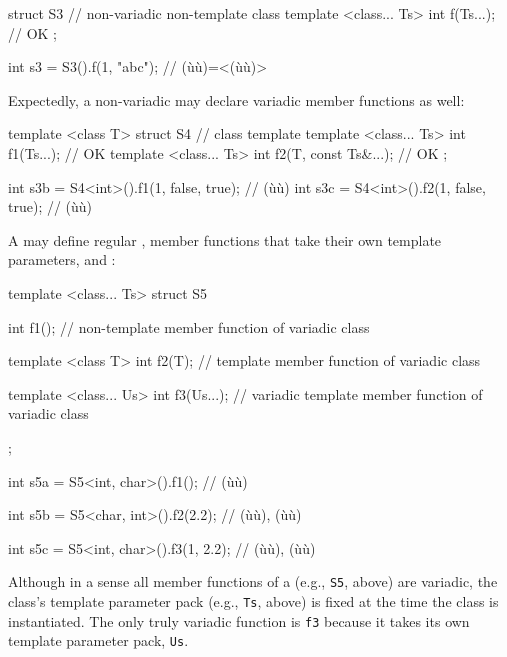 \begin{emcppslisting}
struct S3                                 // non-variadic non-template class
{
    template <class... Ts> int f(Ts...);  // OK
};

int s3 = S3().f(1, "abc");                // (ù{}ù)=<(ù{}ù)>
\end{emcppslisting}
    

\noindent Expectedly, a non-variadic  may declare variadic
member functions as well:

\begin{emcppslisting}
template <class T>
struct S4                                            // class template
{
    template <class... Ts> int f1(Ts...);            // OK
    template <class... Ts> int f2(T, const Ts&...);  // OK
};

int s3b = S4<int>().f1(1, false, true);              // (ù{}ù)
int s3c = S4<int>().f2(1, false, true);              // (ù{}ù)
\end{emcppslisting}
    

\noindent A  may define regular , member functions that take their own template parameters,
and :

\begin{emcppslisting}
template <class... Ts>
struct S5
{
    int f1();       // non-template member function of variadic class

    template <class T>
    int f2(T);      // template member function of variadic class

    template <class... Us>
    int f3(Us...);  // variadic template member function of variadic class
};

int s5a = S5<int, char>().f1();
    // (ù{}ù)

int s5b = S5<char, int>().f2(2.2);
    // (ù{}ù), (ù{}ù)

int s5c = S5<int, char>().f3(1, 2.2);
    // (ù{}ù), (ù{}ù)
\end{emcppslisting}
    

\noindent Although in a sense all member functions of a  (e.g., \lstinline!S5!, above) are variadic, the class's template
parameter pack (e.g., \lstinline!Ts!, above) is fixed at the time the class
is instantiated. The only truly variadic function is \lstinline!f3! because
it takes its own template parameter pack, \lstinline!Us!.

